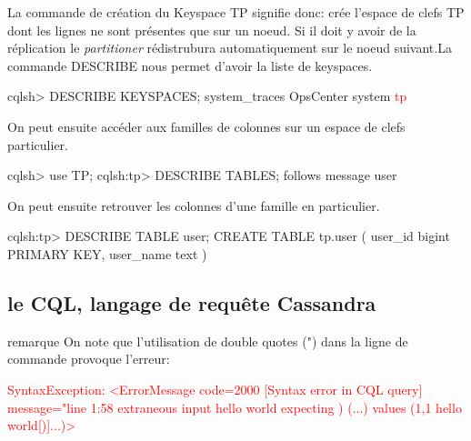 \par La commande de création du Keyspace TP signifie donc: crée l'espace de clefs TP dont les lignes ne sont présentes que sur un noeud.
Si il doit y avoir de la réplication le \textit{partitioner} rédistrubura automatiquement sur le noeud suivant.\newline La commande DESCRIBE nous permet d'avoir la liste de keyspaces.\newline
\begin{tt} 
\indent cqlsh> DESCRIBE KEYSPACES; \newline 
\indent system\_traces  OpsCenter  system  \textcolor{red}{tp}\end{tt}\newline
On peut ensuite accéder aux familles de colonnes sur un espace de clefs particulier.\newline
\begin{tt}
\indent cqlsh> use TP; \newline 
\indent cqlsh:tp> DESCRIBE TABLES;\newline 
\indent follows  message  user\end{tt}\newline
On peut ensuite retrouver les colonnes d'une famille en particulier. \newline
\begin{tt}
\indent cqlsh:tp> DESCRIBE TABLE user; \newline 
\indent CREATE TABLE tp.user (\newline 
\indent \indent user\_id bigint PRIMARY KEY, \newline
\indent \indent user\_name text \newline 
\indent )\end{tt} 

\subsection{le CQL, langage de requête Cassandra}


\par 
\begin{block}{remarque}
On note que l\rq utilisation de double quotes (") dans la ligne de commande provoque l'erreur: \newline
\begin{tt}
\textcolor{red}{
SyntaxException: <ErrorMessage code=2000 [Syntax error in CQL query]
message="line 1:58 extraneous input hello world expecting ) (...) values (1,1 hello world[)]...)>
}
\end{tt}
\end{block}
